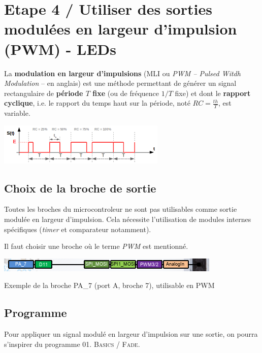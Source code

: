 \documentclass[a4paper,11pt,titlepage]{article} %
\begin{document}
\newpage
\section{Etape 4 / Utiliser des sorties modulées en largeur d'impulsion (PWM) - LEDs}

La \textbf{modulation en largeur d'impulsions} (MLI ou \textit{PWM – Pulsed Witdh Modulation} – en anglais) est une méthode permettant de générer un signal rectangulaire de \textbf{période $T$ fixe} (ou de fréquence $1/T$ fixe) et dont le \textbf{rapport cyclique}, i.e. le rapport du temps haut sur la période, noté $RC = \frac{th}{T}$, est variable.

\begin{center}
	\includegraphics[width=0.6\textwidth]{images/MINE_ElecNum_PWM_SignalPrincipe.png}
\end{center}

\subsection{Choix de la broche de sortie}

Toutes les broches du microcontroleur ne sont pas utilisables comme sortie modulée en largeur d'impulsion. Cela nécessite l'utilisation de modules internes spécifiques (\textit{timer} et comparateur notamment).

Il faut choisir une broche où le terme \textit{PWM} est mentionné.

\begin{center}
	\includegraphics{images/nucleo_pin_functions.png}
	
	Exemple de la broche PA\_7 (port A, broche 7), utilisable en PWM
\end{center}


\subsection{Programme}

Pour appliquer un signal modulé en largeur d'impulsion sur une sortie, on pourra s'inspirer du programme \textsc{01. Basics / Fade}.
\end{document}
